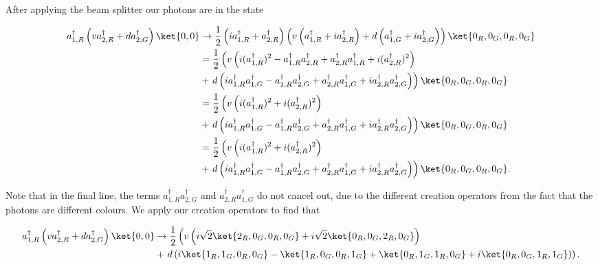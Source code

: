 After applying the beam splitter our photons are in the state

\begin{align}
a_{1,R}^\dagger\left(v a_{2,R}^\dagger + da_{2,G}^\dagger\right)\ket{0,0} &\rightarrow \frac{1}{2}\left(ia_{1,R}^\dagger + a_{2,R}^\dagger\right)\left(v\left(a_{1,R}^\dagger + ia_{2,R}^\dagger\right) + d\left(a_{1,G}^\dagger + ia_{2,G}^\dagger\right)\right)\ket{0_R,0_G,0_R,0_G}\\
&= \frac{1}{2}\left(v\left(i(a_{1,R}^\dagger)^2 - a_{1,R}^\dagger a_{2,R}^\dagger + a_{2,R}^\dagger a_{1,R}^\dagger+i(a_{2,R}^\dagger)^2\right)\right.\\
&+\left. d\left(ia_{1,R}^\dagger a_{1,G}^\dagger - a_{1,R}^\dagger a_{2,G}^\dagger + a_{2,R}^\dagger a_{1,G}^\dagger+ia_{2,R}^\dagger a_{2,G}^\dagger \right)\right)\ket{0_R,0_G,0_R,0_G}\\
&= \frac{1}{2}\left(v\left(i(a_{1,R}^\dagger)^2 +i(a_{2,R}^\dagger)^2\right)\right.\\
&+\left. d\left(ia_{1,R}^\dagger a_{1,G}^\dagger - a_{1,R}^\dagger a_{2,G}^\dagger + a_{2,R}^\dagger a_{1,G}^\dagger+ia_{2,R}^\dagger a_{2,G}^\dagger \right)\right)\ket{0_R,0_G,0_R,0_G}\\
&= \frac{1}{2}\left(v\left(i(a_{1,R}^\dagger)^2 +i(a_{2,R}^\dagger)^2\right)\right.\nonumber\\
&+\left. d\left(ia_{1,R}^\dagger a_{1,G}^\dagger - a_{1,R}^\dagger a_{2,G}^\dagger + a_{2,R}^\dagger a_{1,G}^\dagger+ia_{2,R}^\dagger a_{2,G}^\dagger \right)\right)\ket{0_R,0_G,0_R,0_G}.
\end{align}

Note that in the final line, the terms $a_{1,R}^\dagger a_{2,G}^\dagger$ and $a_{2,R}^\dagger a_{1,G}^\dagger$ do not cancel out, due to the different creation operators from the fact that the photons are different colours. We apply our creation operators to find that

\begin{align}
a_{1,R}^\dagger\left(v a_{2,R}^\dagger + da_{2,G}^\dagger\right)\ket{0,0} &\rightarrow \frac{1}{2}\left(v\left(i\sqrt{2}\ket{2_R,0_G,0_R,0_G} +i\sqrt{2}\ket{0_R,0_G,2_R,0_G}\right)\right.\nonumber\\
&+\left. d\left(i\ket{1_R,1_G,0_R,0_G} - \ket{1_R,0_G,0_R,1_G} + \ket{0_R,1_G,1_R,0_G}+i\ket{0_R,0_G,1_R,1_G} \right)\right).
\end{align}

